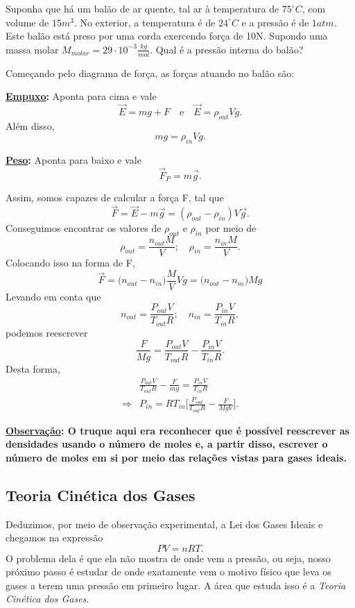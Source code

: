\documentclass[PhysicsII/phsyicsII_notes.tex]{subfiles}
\begin{document}
\begin{example}
	Suponha que há um balão de ar quente, tal ar à temperatura de \(75^{\circ{}}C\), com volume de \(15m^{3}\).
	No exterior, a temperatura é de \(24^{\circ{}}C\) e a pressão é de \(1atm\). Este balão está preso por uma corda exercendo
	força de 10N. Supondo uma massa molar \(M_{molar} = 29 \cdot 10^{-3}\frac{kg}{mol}\). Qual é a pressão interna do balão?

	Começando pelo diagrama de força, as forças atuando no balão são:

	\textbf{\underline{Empuxo}:}
	Aponta para cima e vale
	\[
		\vec{E} = mg + F\quad\text{e}\quad \vec{E} = \rho_{out} Vg.
	\]
	Além disso,
	\[
		mg = \rho_{in}Vg.
	\]

	\textbf{\underline{Peso}:}
	Aponta para baixo e vale
	\[
		\vec{F}_{P} = m \vec{g}.
	\]

	Assim, somos capazes de calcular a força F, tal que
	\[
		\vec{F} = \vec{E} - m \vec{g} = (\rho_{out}-\rho_{in})V \vec{g}.
	\]
	Conseguimos encontrar os valores de \(\rho_{out}\) e \(\rho_{in}\) por meio de
	\[
		\rho_{out} = \frac{n_{out}M}{V};\quad \rho_{in} = \frac{n_{in}M}{V}.
	\]
	Colocando isso na forma de F,
	\[
		\vec{F} = \biggl(n_{out}-n_{in}\biggr)\frac{M}{V}Vg = \biggl(n_{out}-n_{in}\biggr)Mg
	\]
	Levando em conta que
	\[
		n_{out} = \frac{P_{out}V}{T_{out}R};\quad n_{in} = \frac{P_{in}V}{T_{in}R},
	\]
	podemos reescrever
	\[
		\frac{F}{Mg} = \frac{P_{out}V}{T_{out}R} - \frac{P_{in}V}{T_{in}R}.
	\]
	Desta forma,
	\begin{align*}
		            & \frac{P_{out}V}{T_{out}R} - \frac{F}{mg} = \frac{P_{in}V}{T_{in}R}      \\
		\Rightarrow & P_{in} = RT_{in}\biggl[\frac{P_{out}}{T_{out}R} - \frac{F}{MgV}\biggr].
	\end{align*}

	\textbf{\underline{Observação}: O truque aqui era reconhecer que é possível reescrever as densidades usando o número
		de moles e, a partir disso, escrever o número de moles em si por meio das relações vistas para gases ideais.}
\end{example}
\subsection{Teoria Cinética dos Gases}
Deduzimos, por meio de observação experimental, a Lei dos Gases Ideais e chegamos na expressão
\[
	PV = nRT.
\]
O problema dela é que ela não mostra de onde vem a pressão, ou seja, nosso próximo passo é estudar de onde
exatamente vem o motivo físico que leva os gases a terem uma pressão em primeiro lugar. A área que estuda isso
é a \textit{Teoria Cinética dos Gases}.
\end{document}
